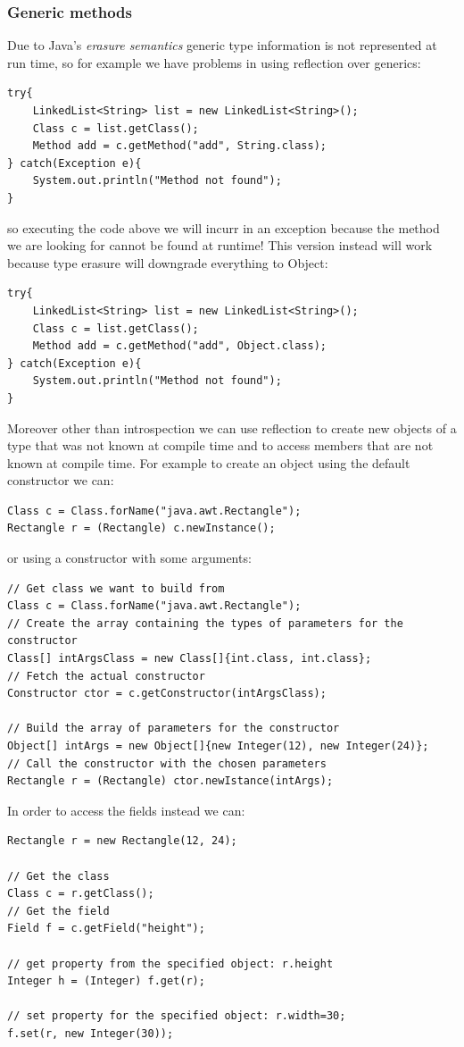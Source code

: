 \subsubsection{Generic methods}
Due to Java's \emph{erasure semantics} generic type information is not represented at run time, so for example we have problems in using reflection over generics:
\begin{verbatim}
try{
    LinkedList<String> list = new LinkedList<String>();
    Class c = list.getClass();
    Method add = c.getMethod("add", String.class);
} catch(Exception e){
    System.out.println("Method not found");
}
\end{verbatim}
so executing the code above we will incurr in an exception because the method we are looking for cannot be found at runtime!
This version instead will work because type erasure will downgrade everything to Object:
\begin{verbatim}
try{
    LinkedList<String> list = new LinkedList<String>();
    Class c = list.getClass();
    Method add = c.getMethod("add", Object.class);
} catch(Exception e){
    System.out.println("Method not found");
}
\end{verbatim}

Moreover other than introspection we can use reflection to create new objects of a type that was not known at compile time and to access members that are not known at compile time.
For example to create an object using the default constructor we can:
\begin{verbatim}
Class c = Class.forName("java.awt.Rectangle");
Rectangle r = (Rectangle) c.newInstance();
\end{verbatim}
or using a constructor with some arguments:
\begin{verbatim}
// Get class we want to build from
Class c = Class.forName("java.awt.Rectangle");
// Create the array containing the types of parameters for the constructor
Class[] intArgsClass = new Class[]{int.class, int.class};
// Fetch the actual constructor
Constructor ctor = c.getConstructor(intArgsClass);

// Build the array of parameters for the constructor 
Object[] intArgs = new Object[]{new Integer(12), new Integer(24)};
// Call the constructor with the chosen parameters
Rectangle r = (Rectangle) ctor.newIstance(intArgs);
\end{verbatim}

In order to access the fields instead we can:
\begin{verbatim}
Rectangle r = new Rectangle(12, 24);

// Get the class
Class c = r.getClass();
// Get the field
Field f = c.getField("height");

// get property from the specified object: r.height
Integer h = (Integer) f.get(r);

// set property for the specified object: r.width=30;
f.set(r, new Integer(30));
\end{verbatim}

